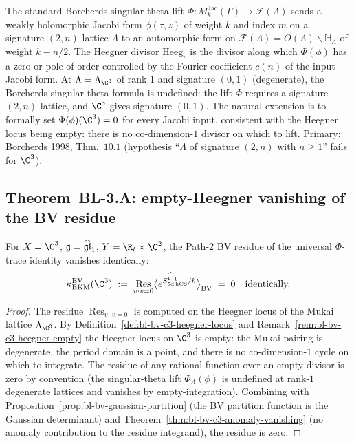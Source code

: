 \begin{remark}[Why $\mathrm{Heeg}_v(\C^3) = \emptyset$]
\label{rem:bl-bv-c3-heegner-empty}
The standard Borcherds singular-theta lift
$\Phi : M_k^{\mathrm{Jac}}(\Gamma) \to \mathcal{F}(\Lambda)$
sends a weakly holomorphic Jacobi form $\phi(\tau, z)$ of weight
$k$ and index $m$ on a signature-$(2, n)$ lattice $\Lambda$ to an
automorphic form on $\mathcal{F}(\Lambda) = O(\Lambda)\backslash
\mathbb{H}_\Lambda$ of weight $k - n/2$. The Heegner divisor
$\mathrm{Heeg}_v$ is the divisor along which $\Phi(\phi)$ has a
zero or pole of order controlled by the Fourier coefficient
$c(n)$ of the input Jacobi form. At $\Lambda = \Lambda_{\C^3}$ of
rank $1$ and signature $(0, 1)$ (degenerate), the Borcherds
singular-theta formula is undefined: the lift $\Phi$ requires a
signature-$(2, n)$ lattice, and $\C^3$ gives signature $(0, 1)$.
The natural extension is to formally set $\Phi(\phi)(\C^3) = 0$ for
every Jacobi input, consistent with the Heegner locus being empty:
there is no co-dimension-$1$ divisor on which to lift.
Primary: Borcherds 1998, Thm.~$10.1$ (hypothesis ``$\Lambda$ of
signature $(2, n)$ with $n\geq 1$'' fails for $\C^3$).
\end{remark}

\subsection*{Theorem~BL-3.A: empty-Heegner vanishing of the BV residue}

\begin{theorem}
\label{thm:bl-bv-c3-vanishing}
\ClaimStatusProvedHere
For $X = \C^3$, $\mathfrak{g} = \widehat{\mathfrak{gl}}_1$, $Y = \R_t\times\C^2$, the
Path-$2$ BV residue of the universal $\Phi$-trace identity vanishes
identically:
\[
  \kBKM^{\mathrm{BV}}(\C^3)
  \;:=\;
  \operatorname*{Res}_{v\cdot v = 0}
  \bigl\langle e^{S_{5\mathrm{d\,hCS}}^{\ghat}/\hbar}\bigr\rangle_\BV
  \;=\; 0
  \quad\text{identically.}
\]
\end{theorem}

\begin{proof}
The residue $\operatorname*{Res}_{v\cdot v = 0}$ is computed on the
Heegner locus of the Mukai lattice $\Lambda_{\C^3}$. By
Definition~\ref{def:bl-bv-c3-heegner-locus} and
Remark~\ref{rem:bl-bv-c3-heegner-empty} the Heegner locus on $\C^3$
is empty: the Mukai pairing is degenerate, the period domain is a
point, and there is no co-dimension-$1$ cycle on which to integrate.
The residue of any rational function over an empty divisor is zero
by convention (the singular-theta lift
$\Phi_\Lambda(\phi)$ is undefined at rank-$1$ degenerate lattices
and vanishes by empty-integration). Combining with
Proposition~\ref{prop:bl-bv-gaussian-partition} (the BV partition
function is the Gaussian determinant) and
Theorem~\ref{thm:bl-bv-c3-anomaly-vanishing} (no anomaly contribution
to the residue integrand), the residue is zero.
\end{proof}

